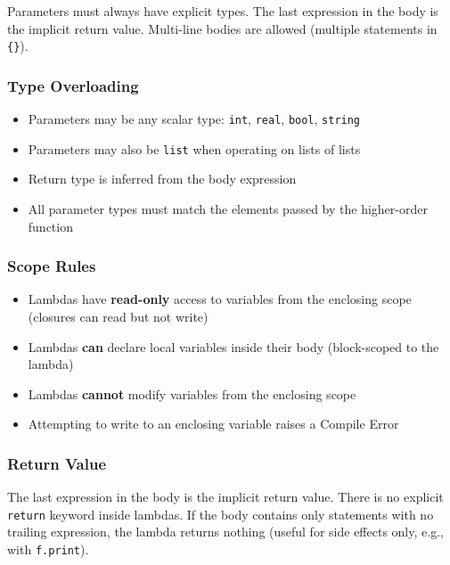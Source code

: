 Parameters must always have explicit types. The last expression in the body is the implicit return value. Multi-line bodies are allowed (multiple statements in \texttt{\{\}}).

\subsubsection{Type Overloading}
\begin{itemize}
\item Parameters may be any scalar type: \texttt{int}, \texttt{real}, \texttt{bool}, \texttt{string}
\item Parameters may also be \texttt{list} when operating on lists of lists
\item Return type is inferred from the body expression
\item All parameter types must match the elements passed by the higher-order function
\end{itemize}

\subsubsection{Scope Rules}
\begin{itemize}
\item Lambdas have \textbf{read-only} access to variables from the enclosing scope (closures can read but not write)
\item Lambdas \textbf{can} declare local variables inside their body (block-scoped to the lambda)
\item Lambdas \textbf{cannot} modify variables from the enclosing scope
\item Attempting to write to an enclosing variable raises a Compile Error
\end{itemize}

\subsubsection{Return Value}
The last expression in the body is the implicit return value. There is no explicit \texttt{return} keyword inside lambdas. If the body contains only statements with no trailing expression, the lambda returns nothing (useful for side effects only, e.g., with \texttt{f.print}).

